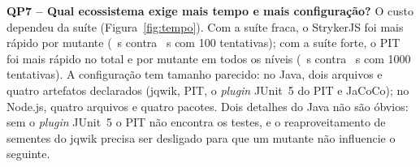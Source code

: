 \textbf{QP7 -- Qual ecossistema exige mais tempo e mais configuração?} O custo dependeu da suíte (Figura~\ref{fig:tempo}). Com a suíte fraca, o StrykerJS foi mais rápido por mutante (\tpmNodeFracaCem{}~s contra \tpmJavaFracaCem{}~s com 100 tentativas); com a suíte forte, o PIT foi mais rápido no total e por mutante em todos os níveis (\tmutJavaForteMil{}~s contra \tmutNodeForteMil{}~s com 1000 tentativas). A configuração tem tamanho parecido: no Java, dois arquivos e quatro artefatos declarados (jqwik, PIT, o \textit{plugin} JUnit~5 do PIT e JaCoCo); no Node.js, quatro arquivos e quatro pacotes. Dois detalhes do Java não são óbvios: sem o \textit{plugin} JUnit~5 o PIT não encontra os testes, e o reaproveitamento de sementes do jqwik precisa ser desligado para que um mutante não influencie o seguinte.
